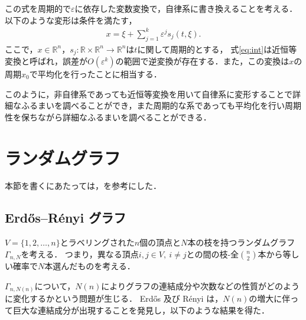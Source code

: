 \documentclass[../main]{subfiles}
\begin{document}
この式を周期的で$\varepsilon$に依存した変数変換で，自律系に書き換えることを考える．
以下のような変形は条件を満たす，
\begin{align}
    \label{eq:int}
    x=\xi+\sum_{j=1}^k \varepsilon^j s_j(t,\xi).
\end{align}
ここで，$x\in\mathbb{R}^n$，$s_j:\mathbb{R}\times\mathbb{R}^n\to\mathbb{R}^n$は$t$に関して周期的とする，
式\eqref{eq:int}は近恒等変換と呼ばれ，誤差が$O(\varepsilon^k)$の範囲で逆変換が存在する．また，この変換は$x$の周期$x_0$で平均化を行ったことに相当する．

このように，非自律系であっても近恒等変換を用いて自律系に変形することで詳細なふるまいを調べることができ，また周期的な系であっても平均化を行い周期性を保ちながら詳細なふるまいを調べることができる．
\section{ランダムグラフ}
本節を書くにあたっては，\cite{Bollobas2013,Albert2002}を参考にした．
\subsection{Erd\H{o}s–R\'{e}nyi グラフ}
\label{sec:er-graph}
$V=\{1,2,\ldots,n\}$とラベリングされた$n$個の頂点と$N$本の枝を持つランダムグラフ$\Gamma_{n,N}$を考える．
つまり，異なる頂点$i,j\in V,\ i\neq j$との間の枝-全$\binom{n}{2}$本から等しい確率で$N$本選んだものを考える．

$\Gamma_{n,N(n)}$について，$N(n)$によりグラフの連結成分や次数などの性質がどのように変化するかという問題が生じる．
Erd\H{o}s 及び R\'{e}nyi は，$N(n)$の増大に伴って巨大な連結成分が出現することを発見し，以下のような結果を得た．
\end{document}
